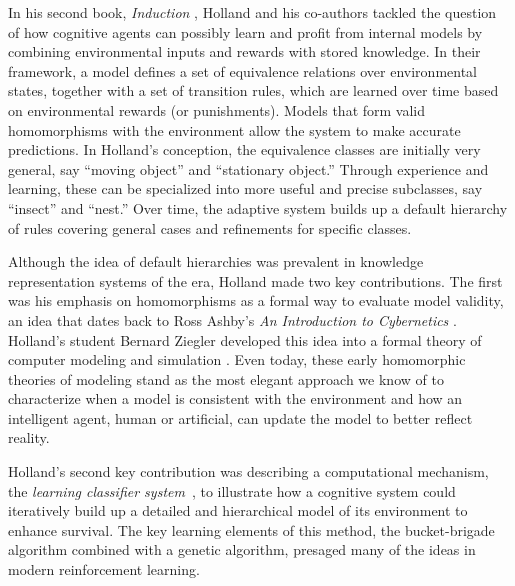 \documentclass{sig-alternate}
\begin{document}
In his second book, \emph{Induction} \cite{Holland1989}, Holland and
his co-authors tackled the question of how cognitive agents can
possibly learn and profit from internal models by combining
environmental inputs and rewards with stored knowledge.  In their
framework, a model defines a set of equivalence relations over
environmental states, together with a set of transition rules, which
are learned over time based on environmental rewards (or punishments).
Models that form valid homomorphisms with the environment allow the
system to make accurate predictions.  In Holland's conception, the
equivalence classes are initially very general, say ``moving object''
and ``stationary object.'' Through experience and
learning, these can be specialized into more useful and precise subclasses, say
``insect'' and ``nest.''  Over time, the adaptive system builds up a
default hierarchy of rules covering general cases and refinements for
specific classes.


Although the idea of default hierarchies was prevalent in 
knowledge representation systems of the era, Holland made two key
contributions.  The first was his emphasis on homomorphisms as a formal way to
evaluate model validity, an idea that dates back to Ross Ashby's
\emph{An Introduction to Cybernetics} \cite{Ashby1956}. Holland's student
Bernard Ziegler developed this idea into a formal theory of computer modeling
and simulation \cite{Ziegler1976}.  
Even today, these early homomorphic theories of modeling
stand as the most elegant approach we know of to characterize when
a model is consistent with the environment and how an intelligent
agent, human or artificial, can update the model to better reflect
reality.

Holland's second key contribution was describing a computational
mechanism, the \emph{learning classifier
  system}~\cite{Holland1977,Holland1986}, to illustrate how a cognitive system could
iteratively build up a detailed and hierarchical model of its
environment to enhance survival.  The key learning elements of this method, the
bucket-brigade algorithm combined with a genetic algorithm, presaged many of the ideas in modern reinforcement
learning. 
\end{document}
